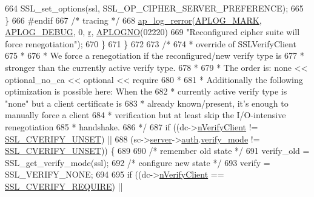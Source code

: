 \begin{DoxyCode}
{664                 SSL\_set\_options(ssl, SSL\_OP\_CIPHER\_SERVER\_PREFERENCE);
665             \}
666 \textcolor{preprocessor}{#endif}
667             \textcolor{comment}{/* tracing */}
668             \hyperlink{group__APACHE__CORE__LOG_ga4c112558ccffd6b363da102b2052d2a6}{ap\_log\_rerror}(\hyperlink{group__APACHE__CORE__LOG_ga655e126996849bcb82e4e5a14c616f4a}{APLOG\_MARK}, \hyperlink{group__APACHE__CORE__LOG_gadfcef90537539cf2b7d35cfbbbafeb93}{APLOG\_DEBUG}, 0, 
      \hyperlink{group__APACHE__CORE__CONFIG_ga091cdd45984e865a888a4f8bb8fe107a}{r}, \hyperlink{group__APACHE__CORE__LOG_ga1dee8a07e06bc5b3de8b89662c2cd666}{APLOGNO}(02220)
669                          \textcolor{stringliteral}{"Reconfigured cipher suite will force renegotiation"});
670         \}
671     \}
672 
673     \textcolor{comment}{/*}
674 \textcolor{comment}{     * override of SSLVerifyClient}
675 \textcolor{comment}{     *}
676 \textcolor{comment}{     * We force a renegotiation if the reconfigured/new verify type is}
677 \textcolor{comment}{     * stronger than the currently active verify type.}
678 \textcolor{comment}{     *}
679 \textcolor{comment}{     * The order is: none << optional\_no\_ca << optional << require}
680 \textcolor{comment}{     *}
681 \textcolor{comment}{     * Additionally the following optimization is possible here: When the}
682 \textcolor{comment}{     * currently active verify type is "none" but a client certificate is}
683 \textcolor{comment}{     * already known/present, it's enough to manually force a client}
684 \textcolor{comment}{     * verification but at least skip the I/O-intensive renegotiation}
685 \textcolor{comment}{     * handshake.}
686 \textcolor{comment}{     */}
687     \textcolor{keywordflow}{if} ((dc->\hyperlink{structSSLDirConfigRec_a14e467401d7c727ed0ccac9482b29704}{nVerifyClient} != \hyperlink{group__MOD__SSL__PRIVATE_gga5473d623bb868c0030b9d21ff13b04f5a44c340c2751c90ce599075f39b5250b7}{SSL\_CVERIFY\_UNSET}) ||
688         (sc->\hyperlink{structSSLSrvConfigRec_a7941dbc2f9fa504b3968a4afdc4b96fc}{server}->\hyperlink{structmodssl__ctx__t_a55144723f90510fb094554f7652f0ef0}{auth}.\hyperlink{structmodssl__auth__ctx__t_a47d63b1be7c8c677b90d2787f0f8dc00}{verify\_mode} != \hyperlink{group__MOD__SSL__PRIVATE_gga5473d623bb868c0030b9d21ff13b04f5a44c340c2751c90ce599075f39b5250b7}{SSL\_CVERIFY\_UNSET})) \{
689 
690         \textcolor{comment}{/* remember old state */}
691         verify\_old = SSL\_get\_verify\_mode(ssl);
692         \textcolor{comment}{/* configure new state */}
693         verify = SSL\_VERIFY\_NONE;
694 
695         \textcolor{keywordflow}{if} ((dc->\hyperlink{structSSLDirConfigRec_a14e467401d7c727ed0ccac9482b29704}{nVerifyClient} == \hyperlink{group__MOD__SSL__PRIVATE_gga5473d623bb868c0030b9d21ff13b04f5a7dc94ef0b594ecb70742fd3599377b50}{SSL\_CVERIFY\_REQUIRE}) ||
}
\end{DoxyCode}
